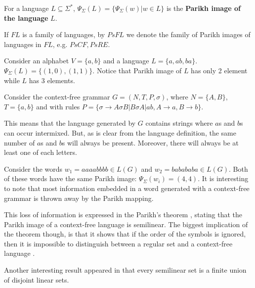 \begin{definition}
For a language $L\subseteq \Sigma^*$, $\Psi_\Sigma(L)=\{\Psi_\Sigma(w)|w\in L\}$ is the {\bf Parikh image of the language} $L$.
\end{definition}

\begin{definition}
If $FL$ is a family of languages, by $PsFL$ we denote the family of Parikh images of languages in $FL$, e.g. $PsCF, PsRE$.
\end{definition}

\begin{example}
Consider an alphabet $V=\{a,b\}$ and a language $L=\{a, ab, ba\}$.
$\Psi_\Sigma(L)=\{(1,0), (1,1)\}$. Notice that Parikh image of $L$ has only 2 element while $L$ has 3 elements.
\end{example}

\begin{example}
  Consider the context-free grammar $G = (N,T,P,\sigma)$, where $N=\{A,B\}$, $T=\{a,b\}$ and with rules $P=\{\sigma\rightarrow A\sigma B|B\sigma A|ab, A\rightarrow a, B\rightarrow b\}$.

  This means that the language generated by $G$ contains strings where $a$s and $b$s can occur intermixed. But, as is clear from the language definition, the same number of $a$s and $b$s will always be present. Moreover, there will always be at least one of each letters.

  Consider the words $w_1 = aaaabbbb \in L(G)$ and $w_2 = babababa \in L(G)$. Both of these words have the same Parikh image: $\Psi_\Sigma(w_i) = (4,4)$. It is interesting to note that most information embedded in a word generated with a context-free grammar is thrown away by the Parikh mapping.
\end{example}

This loss of information is expressed in the Parikh's theorem \cite{Parikh66}, stating that the Parikh image of a context-free language is semilinear. The biggest implication of the theorem though, is that it shows that if the order of the symbols is ignored, then it is impossible to distinguish between a regular set and a context-free language \cite{Kozen97Automata}.

Another interesting result appeared in \cite{Ito69Semilinear} that every semilinear set is a finite union of disjoint linear sets.

